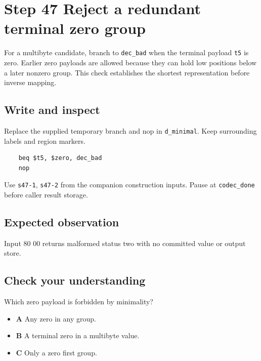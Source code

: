 \section{Step 47 Reject a redundant terminal zero group}\label{delta-s47}

For a multibyte candidate, branch to \texttt{dec\_bad} when the terminal payload \texttt{t5} is zero. Earlier zero payloads are allowed because they can hold low positions below a later nonzero group. This check establishes the shortest representation before inverse mapping.

\subsection{Write and inspect}
Replace the supplied temporary branch and nop in \texttt{d\_minimal}. Keep surrounding labels and region markers.

\begin{verbatim}
    beq $t5, $zero, dec_bad
    nop
\end{verbatim}
Use \texttt{s47-1}, \texttt{s47-2} from the companion construction inputs. Pause at \texttt{codec\_done} before caller result storage.

\subsection{Expected observation}
Input 80 00 returns malformed status two with no committed value or output store.

\subsection{Check your understanding}
Which zero payload is forbidden by minimality?

\begin{itemize}
  \item \textbf{A} Any zero in any group.
  \item \textbf{B} A terminal zero in a multibyte value.
  \item \textbf{C} Only a zero first group.
\end{itemize}
